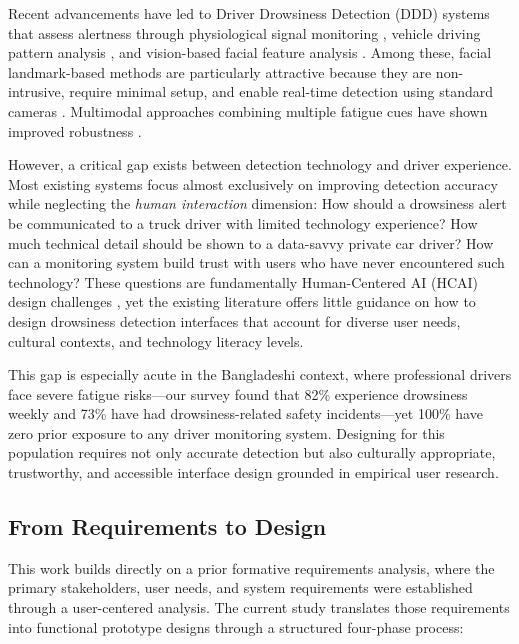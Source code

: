 \documentclass[sigconf]{acmart}
\begin{document}
Recent advancements have led to Driver Drowsiness Detection (DDD) systems that assess alertness through physiological signal monitoring \cite{ref4}, vehicle driving pattern analysis \cite{ref5}, and vision-based facial feature analysis \cite{ref6, ref8}. Among these, facial landmark-based methods are particularly attractive because they are non-intrusive, require minimal setup, and enable real-time detection using standard cameras \cite{ref9}. Multimodal approaches combining multiple fatigue cues have shown improved robustness \cite{ref10}.

However, a critical gap exists between detection technology and driver experience. Most existing systems focus almost exclusively on improving detection accuracy while neglecting the \textit{human interaction} dimension: How should a drowsiness alert be communicated to a truck driver with limited technology experience? How much technical detail should be shown to a data-savvy private car driver? How can a monitoring system build trust with users who have never encountered such technology? These questions are fundamentally Human-Centered AI (HCAI) design challenges \cite{ref14}, yet the existing literature offers little guidance on how to design drowsiness detection interfaces that account for diverse user needs, cultural contexts, and technology literacy levels.

This gap is especially acute in the Bangladeshi context, where professional drivers face severe fatigue risks---our survey found that 82\% experience drowsiness weekly and 73\% have had drowsiness-related safety incidents---yet 100\% have zero prior exposure to any driver monitoring system. Designing for this population requires not only accurate detection but also culturally appropriate, trustworthy, and accessible interface design grounded in empirical user research.

\subsection{From Requirements to Design}

This work builds directly on a prior formative requirements analysis, where the primary stakeholders, user needs, and system requirements were established through a user-centered analysis. The current study translates those requirements into functional prototype designs through a structured four-phase process:
\end{document}
